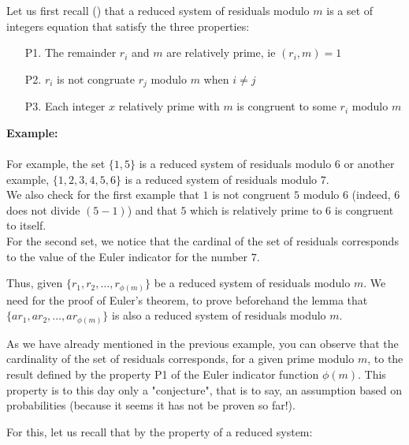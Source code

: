 	\begin{dem}
	Let us first recall () that a reduced system of residuals modulo $m$ is a set of integers equation that satisfy the three properties:
	\begin{enumerate}
		\item[P1.] The remainder $r_i$ and $m$ are relatively prime, ie $(r_i,m)=1$

		\item[P2.] $r_i$ is not congruate $r_j$ modulo $m$ when $i\neq j$

		\item[P3.] Each integer $x$ relatively prime with $m$ is congruent to some $r_i$ modulo $m$
	\end{enumerate}
	\begin{tcolorbox}[colframe=black,colback=white,sharp corners]
	\textbf{{\Large {}}Example:}\\\\
	For example, the set $\{1,5\}$ is a reduced system of residuals modulo $6$ or another example, $\{1,2,3,4,5,6\}$ is a reduced system of residuals modulo $7$. \\

	We also check for the first example that $1$ is not congruent $5$ modulo $6$ (indeed, $6$ does not divide $(5-1)$) and that $5$ which is relatively prime to $6$ is congruent to itself.\\

	For the second set, we notice that the cardinal of the set of residuals corresponds to the value of the Euler indicator for the number $7$.
	\end{tcolorbox}
	\begin{lemma}
	Thus, given $\{r_1,r_2,\ldots,r_{\phi(m)}\}$ be a reduced system of residuals modulo $m$. We need for the proof of Euler's theorem, to prove beforehand the lemma that $\{ar_1,ar_2,\ldots,ar_{\phi(m)}\}$ is also a reduced system of residuals modulo $m$.
	\end{lemma}
	
	\begin{tcolorbox}[title=Remark,colframe=black,arc=10pt]
	As we have already mentioned in the previous example, you can observe that the cardinality of the set of residuals corresponds, for a given prime modulo $m$, to the result defined by the property P1 of the Euler indicator function $\phi(m)$. This property is to this day only a "conjecture", that is to say, an assumption based on probabilities (because it seems it has not be proven so far!).
	\end{tcolorbox}
	For this, let us recall that by the property of a reduced system:
	

\end{dem}
